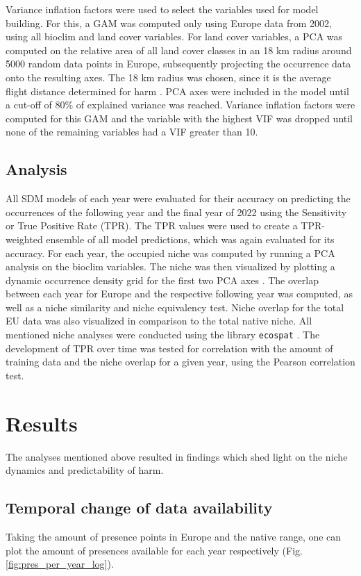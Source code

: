 \documentclass[12pt,a4paper]{article}
\begin{document}
Variance inflation factors were used to select the variables used for model building.
For this, a GAM was computed only using Europe data from 2002, using all bioclim and land cover variables.
For land cover variables, a PCA was computed on the relative area of all land cover classes in an 18 km radius around 5000 random data points in Europe, subsequently projecting the occurrence data onto the resulting axes.
The 18 km radius was chosen, since it is the average flight distance determined for \gls{harm} \autocite{jeffries2013flightharmonia}.
PCA axes were included in the model until a cut-off of 80\% of explained variance was reached.
Variance inflation factors were computed for this GAM and the variable with the highest VIF was dropped until none of the remaining variables had a VIF greater than 10.

\subsection{Analysis} \label{ssec:analysis}
All SDM models of each year were evaluated for their accuracy on predicting the occurrences of the following year and the final year of 2022 using the Sensitivity or True Positive Rate (TPR).
The TPR values were used to create a TPR-weighted ensemble of all model predictions, which was again evaluated for its accuracy.
For each year, the occupied niche was computed by running a PCA analysis on the bioclim variables.
The niche was then visualized by plotting a dynamic occurrence density grid for the first two PCA axes \autocite{broennimann2012niche}.
The overlap between each year for Europe and the respective following year was computed, as well as a niche similarity and niche equivalency test.
Niche overlap for the total EU data was also visualized in comparison to the total native niche.
All mentioned niche analyses were conducted using the library \texttt{ecospat} \autocite{dicola2017ecospat}.
The development of TPR over time was tested for correlation with the amount of training data and the niche overlap for a given year, using the Pearson correlation test.

\newpage

\section{Results} \label{sec:results}
The analyses mentioned above resulted in findings which shed light on the niche dynamics and predictability of \gls{harm}.

\subsection{Temporal change of data availability} \label{ssec:temp_data_change}
Taking the amount of presence points in Europe and the native range, one can plot the amount of presences available for each year respectively (Fig. \ref{fig:pres_per_year_log}).
\end{document}
